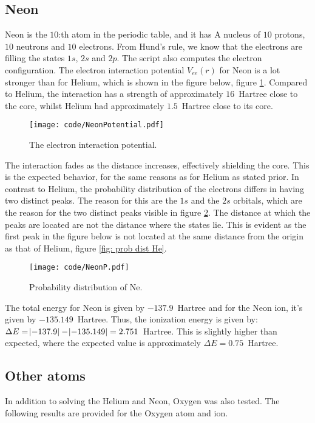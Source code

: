 \documentclass[a4paper]{article}
\begin{document}
\subsection{Neon}
Neon is the $10$:th atom in the periodic table, and it has A nucleus of $10$ protons, $10$ neutrons and $10$ electrons.
From Hund's rule, we know that the electrons are filling the states $1s$, $2s$ and $2p$. The script also computes the electron configuration. 
The electron interaction potential $V_{ee}(r)$ for Neon is a lot stronger than for Helium, which is shown in the figure below, figure \ref{fig: vEE Ne}. Compared to Helium, the interaction has a strength of approximately $16$~Hartree close to the core, whilst Helium had approximately $1.5$~Hartree close to its core.
\begin{figure}[H]
    \centering
    \texttt{[image: code/NeonPotential.pdf]}
    \caption{The electron interaction potential.}
    \label{fig: vEE Ne}
\end{figure}\noindent
The interaction fades as the distance increases, effectively shielding the core. This is the expected behavior, for the same reasons as for Helium as stated prior. In contrast to Helium, the probability distribution of the electrons differs in having two distinct peaks. The reason for this are the $1s$ and the $2s$ orbitals, which are the reason for the two distinct peaks visible in figure \ref{fig: prob dist Ne}.
The distance at which the peaks are located are not the distance where the states lie. This is evident as the first peak in the figure below is not located at the same distance from the origin as that of Helium, figure \ref{fig: prob dist He}.
\begin{figure}[H]
    \centering
    \texttt{[image: code/NeonP.pdf]}
    \caption{Probability distribution of Ne.}
    \label{fig: prob dist Ne}
\end{figure}\noindent
The total energy for Neon is given by $-137.9$~Hartree and for the Neon ion, it's given by $-135.149$~Hartree. Thus, the ionization energy is given by: $\Delta E = \abs{-137.9} - \abs{-135.149} = 2.751$~Hartree. This is slightly higher than expected, where the expected value is approximately $\Delta E = 0.75$~Hartree.
\subsection{Other atoms}
In addition to solving the Helium and Neon, Oxygen was also tested.
The following results are provided for the Oxygen atom and ion.
\end{document}
